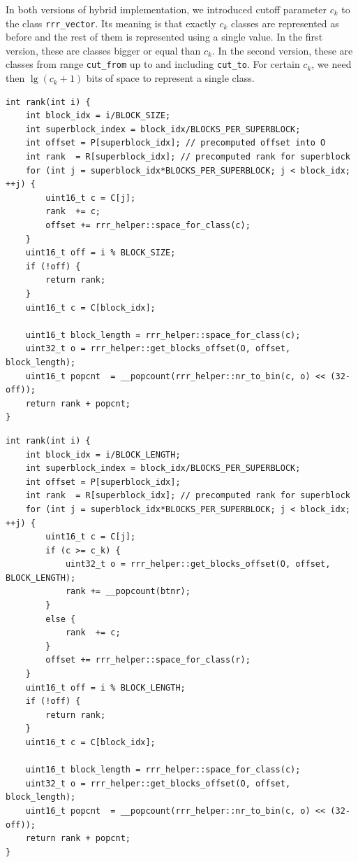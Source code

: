 In both versions of hybrid implementation, we introduced cutoff parameter $c_k$ to the
class \verb'rrr_vector'. Its meaning is that exactly $c_k$ classes are represented
as before and the rest of them is represented using a single value. In the first version,
these are classes bigger or equal than $c_k$. In the second version, these are classes
from range \texttt{cut\_from} up to and including \texttt{cut\_to}. For certain $c_k$,
we need then $\lg (c_k+1)$ bits of space to represent a single class.

\begin{lstlisting}
int rank(int i) {
	int block_idx = i/BLOCK_SIZE;
	int superblock_index = block_idx/BLOCKS_PER_SUPERBLOCK;
	int offset = P[superblock_idx]; // precomputed offset into O
	int rank  = R[superblock_idx]; // precomputed rank for superblock
	for (int j = superblock_idx*BLOCKS_PER_SUPERBLOCK; j < block_idx; ++j) {
		uint16_t c = C[j];
		rank  += c;
		offset += rrr_helper::space_for_class(c);
	}
	uint16_t off = i % BLOCK_SIZE;
	if (!off) {
		return rank;
	}
	uint16_t c = C[block_idx];

	uint16_t block_length = rrr_helper::space_for_class(c);
	uint32_t o = rrr_helper::get_blocks_offset(O, offset, block_length);
	uint16_t popcnt  = __popcount(rrr_helper::nr_to_bin(c, o) << (32-off));
	return rank + popcnt;
}
\end{lstlisting}

\begin{lstlisting}
int rank(int i) {
	int block_idx = i/BLOCK_LENGTH;
	int superblock_index = block_idx/BLOCKS_PER_SUPERBLOCK;
	int offset = P[superblock_idx];
	int rank  = R[superblock_idx]; // precomputed rank for superblock
	for (int j = superblock_idx*BLOCKS_PER_SUPERBLOCK; j < block_idx; ++j) {
		uint16_t c = C[j];
		if (c >= c_k) {
			uint32_t o = rrr_helper::get_blocks_offset(O, offset, BLOCK_LENGTH);
			rank += __popcount(btnr);
		}
		else {
			rank  += c;
		}
		offset += rrr_helper::space_for_class(r);
	}
	uint16_t off = i % BLOCK_LENGTH;
	if (!off) {
		return rank;
	}
	uint16_t c = C[block_idx];

	uint16_t block_length = rrr_helper::space_for_class(c);
	uint32_t o = rrr_helper::get_blocks_offset(O, offset, block_length);
	uint16_t popcnt  = __popcount(rrr_helper::nr_to_bin(c, o) << (32-off));
	return rank + popcnt;
}
\end{lstlisting}

